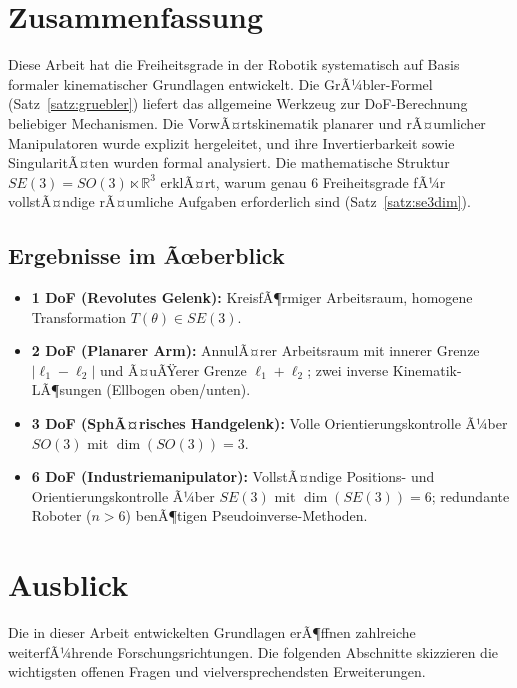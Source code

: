 ﻿\documentclass[a4paper,12pt]{article}
\theoremstyle{definition}
\begin{document}
\section{Zusammenfassung}

Diese Arbeit hat die Freiheitsgrade in der Robotik systematisch auf Basis formaler kinematischer Grundlagen entwickelt. Die GrÃ¼bler-Formel (Satz~\ref{satz:gruebler}) liefert das allgemeine Werkzeug zur DoF-Berechnung beliebiger Mechanismen. Die VorwÃ¤rtskinematik planarer und rÃ¤umlicher Manipulatoren wurde explizit hergeleitet, und ihre Invertierbarkeit sowie SingularitÃ¤ten wurden formal analysiert. Die mathematische Struktur $SE(3) = SO(3) \ltimes \mathbb{R}^3$ erklÃ¤rt, warum genau 6 Freiheitsgrade fÃ¼r vollstÃ¤ndige rÃ¤umliche Aufgaben erforderlich sind (Satz~\ref{satz:se3dim}).

\subsection{Ergebnisse im Ãœberblick}

\begin{itemize}
	\item \textbf{1 DoF (Revolutes Gelenk):} KreisfÃ¶rmiger Arbeitsraum, homogene Transformation $T(\theta) \in SE(3)$.
	\item \textbf{2 DoF (Planarer Arm):} AnnulÃ¤rer Arbeitsraum mit innerer Grenze $|\ell_1-\ell_2|$ und Ã¤uÃŸerer Grenze $\ell_1+\ell_2$; zwei inverse Kinematik-LÃ¶sungen (Ellbogen oben/unten).
	\item \textbf{3 DoF (SphÃ¤risches Handgelenk):} Volle Orientierungskontrolle Ã¼ber $SO(3)$ mit $\dim(SO(3)) = 3$.
	\item \textbf{6 DoF (Industriemanipulator):} VollstÃ¤ndige Positions- und Orientierungskontrolle Ã¼ber $SE(3)$ mit $\dim(SE(3)) = 6$; redundante Roboter ($n > 6$) benÃ¶tigen Pseudoinverse-Methoden.
\end{itemize}

\section{Ausblick}
\label{sec:ausblick}

Die in dieser Arbeit entwickelten Grundlagen erÃ¶ffnen zahlreiche weiterfÃ¼hrende Forschungsrichtungen. Die folgenden Abschnitte skizzieren die wichtigsten offenen Fragen und vielversprechendsten Erweiterungen.
\end{document}
